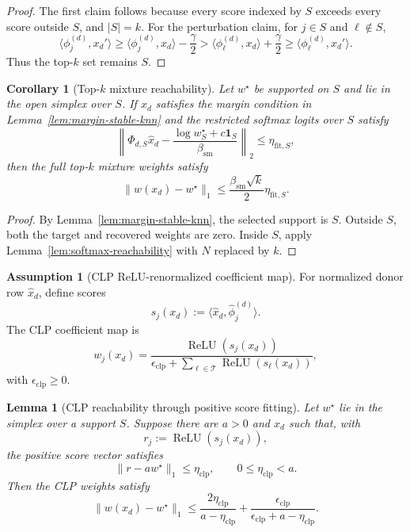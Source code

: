 \documentclass{article}
\theoremstyle{plain}
\newtheorem{lemma}[theorem]{Lemma}
\newtheorem{corollary}[theorem]{Corollary}
\theoremstyle{definition}
\newtheorem{assumption}[theorem]{Assumption}
\theoremstyle{remark}
\begin{document}
\begin{proof}
The first claim follows because every score indexed by $S$ exceeds every score outside $S$, and $|S|=k$. For the perturbation claim, for $j\in S$ and $\ell\notin S$,
\[
\langle \phi_j^{(d)},x_d'\rangle
\ge
\langle \phi_j^{(d)},x_d\rangle-\frac{\gamma}{2}
>
\langle \phi_\ell^{(d)},x_d\rangle+\frac{\gamma}{2}
\ge
\langle \phi_\ell^{(d)},x_d'\rangle.
\]
Thus the top-$k$ set remains $S$.
\end{proof}

\begin{corollary}[Top-$k$ mixture reachability]
\label{cor:topk-mixture-reachability}
Let $w^\star$ be supported on $S$ and lie in the open simplex over $S$. If $x_d$ satisfies the margin condition in Lemma~\ref{lem:margin-stable-knn} and the restricted softmax logits over $S$ satisfy
\[
\left\|
\Phi_{d,S}\widehat{x}_d
-
\frac{\log w^\star_S+c\mathbf{1}_S}{\beta_{\mathrm{sm}}}
\right\|_2
\le
\eta_{\mathrm{fit},S},
\]
then the full top-$k$ mixture weights satisfy
\[
\|w(x_d)-w^\star\|_1
\le
\frac{\beta_{\mathrm{sm}}\sqrt{k}}{2}\eta_{\mathrm{fit},S}.
\]
\end{corollary}

\begin{proof}
By Lemma~\ref{lem:margin-stable-knn}, the selected support is $S$. Outside $S$, both the target and recovered weights are zero. Inside $S$, apply Lemma~\ref{lem:softmax-reachability} with $N$ replaced by $k$.
\end{proof}

\begin{assumption}[CLP ReLU-renormalized coefficient map]
\label{ass:clp-operator}
For normalized donor row $\widehat{x}_d$, define scores
\[
s_j(x_d):=\langle \widehat{x}_d,\widehat{\phi}^{(d)}_j\rangle.
\]
The CLP coefficient map is
\[
w_j(x_d)=
\frac{\operatorname{ReLU}(s_j(x_d))}{\epsilon_{\mathrm{clp}}+\sum_{\ell\in\mathcal{T}}\operatorname{ReLU}(s_\ell(x_d))},
\]
with $\epsilon_{\mathrm{clp}}\ge 0$.
\end{assumption}

\begin{lemma}[CLP reachability through positive score fitting]
\label{lem:clp-reachability}
Let $w^\star$ lie in the simplex over a support $S$. Suppose there are $a>0$ and $x_d$ such that, with
\[
r_j:=\operatorname{ReLU}(s_j(x_d)),
\]
the positive score vector satisfies
\[
\|r-a w^\star\|_1\le \eta_{\mathrm{clp}},
\qquad
0\le \eta_{\mathrm{clp}}<a.
\]
Then the CLP weights satisfy
\[
\|w(x_d)-w^\star\|_1
\le
\frac{2\eta_{\mathrm{clp}}}{a-\eta_{\mathrm{clp}}}
+
\frac{\epsilon_{\mathrm{clp}}}{\epsilon_{\mathrm{clp}}+a-\eta_{\mathrm{clp}}}.
\]
\end{lemma}
\end{document}
